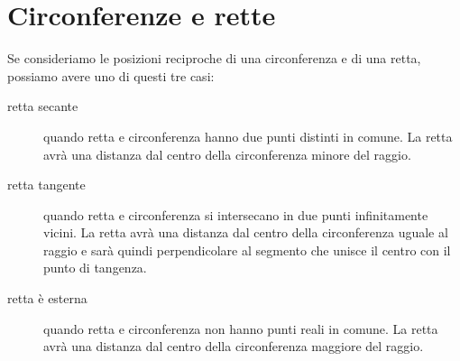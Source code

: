 \section{Circonferenze e rette}
\label{sec:circ_circrette}

Se consideriamo le posizioni reciproche di una circonferenza e di una retta, 
possiamo avere uno di questi tre casi:

\begin{description} %
 \item [retta secante] 
quando retta e circonferenza hanno due punti distinti in comune. La retta avrà 
una distanza dal centro della circonferenza minore del raggio.
 \item [retta tangente]
quando retta e circonferenza si intersecano in due punti infinitamente vicini. 
La retta avrà una distanza dal centro della circonferenza uguale al raggio e 
sarà quindi perpendicolare al segmento che unisce il centro con il punto di 
tangenza.
 \item [retta è esterna]
quando retta e circonferenza non hanno punti reali in comune. La retta avrà una 
distanza dal centro della circonferenza maggiore del raggio. 
\end{description}

\begin{comment}
\noindent\begin{minipage}{.48\textwidth}
TODO
\end{minipage}
\hfill
\begin{minipage}{.48\textwidth}
\begin{center}
\begin{inaccessibleblock}[Circonferenza con una retta secante, una retta 
tangente e una retta esterna.]
\end{inaccessibleblock}
\end{center}
\end{minipage}
\end{comment}

